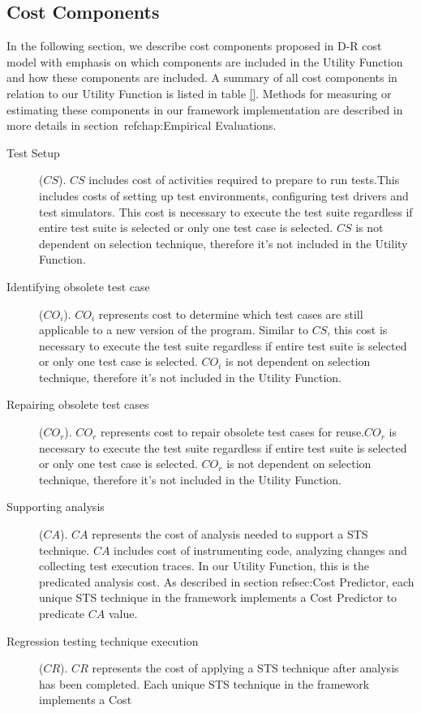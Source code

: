 \subsection{Cost Components}\label{sec:cost_components}
In the following section, we describe cost components proposed in
D-R cost model\cite{DBLP:conf/sigsoft/DoR06} with emphasis on
which components are included in the Utility Function and how these components
are included. A summary of all cost components in relation to our Utility
Function is listed in table \ref{}. Methods for measuring or estimating these
components in our framework implementation are described in more details in
section~ref{chap:Empirical Evaluations}.
\begin{description}
\item[Test Setup]($CS$). $CS$ includes cost of activities
required to prepare to run tests.This includes costs of setting up test environments,
configuring test drivers and test simulators. This cost is necessary to execute
the test suite regardless if entire test suite is selected or only one test
case is selected. $CS$ is not dependent on selection technique,
therefore it's not included in the Utility Function.
\item[Identifying obsolete test case]($CO_i$). $CO_i$ represents
cost to determine which test cases are still applicable to a new version of the
program. Similar to $CS$, this cost is necessary to execute
the test suite regardless if entire test suite is selected or only one test
case is selected. $CO_i$ is not dependent on selection technique,
therefore it's not included in the Utility Function.
\item[Repairing obsolete test cases]($CO_r$). $CO_r$ represents
cost to repair obsolete test cases for reuse.$CO_r$ is necessary to
execute the test suite regardless if entire test suite is selected or only one
test case is selected. $CO_r$ is not dependent on selection technique,
therefore it's not included in the Utility Function.
\item[Supporting analysis]($CA$). $CA$ represents the cost of
analysis needed to support a STS technique. $CA$ includes cost of
instrumenting code, analyzing changes and collecting test execution traces. In
our Utility Function, this is the predicated analysis cost. As described in
section ref{sec:Cost Predictor}, each unique STS technique in the framework
implements a Cost Predictor to predicate $CA$ value.
\item[Regression testing technique execution]($CR$). $CR$ represents the cost of
applying a STS technique after analysis has been completed. Each unique STS technique in the framework implements a Cost

\end{description}
